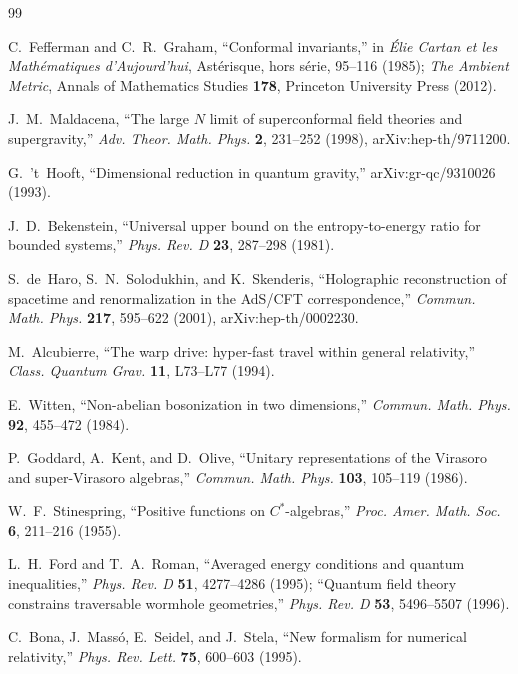 \begin{thebibliography}{99}

C.~Fefferman and C.~R.~Graham, ``Conformal invariants,'' in \textit{Élie Cartan et les Mathématiques d'Aujourd'hui}, Astérisque, hors série, 95--116 (1985); \textit{The Ambient Metric}, Annals of Mathematics Studies \textbf{178}, Princeton University Press (2012).

J.~M.~Maldacena, ``The large $N$ limit of superconformal field theories and supergravity,'' \textit{Adv. Theor. Math. Phys.} \textbf{2}, 231--252 (1998), arXiv:hep-th/9711200.

G.~'t~Hooft, ``Dimensional reduction in quantum gravity,'' arXiv:gr-qc/9310026 (1993).

J.~D.~Bekenstein, ``Universal upper bound on the entropy-to-energy ratio for bounded systems,'' \textit{Phys. Rev. D} \textbf{23}, 287--298 (1981).

S.~de~Haro, S.~N.~Solodukhin, and K.~Skenderis, ``Holographic reconstruction of spacetime and renormalization in the AdS/CFT correspondence,'' \textit{Commun. Math. Phys.} \textbf{217}, 595--622 (2001), arXiv:hep-th/0002230.

M.~Alcubierre, ``The warp drive: hyper-fast travel within general relativity,'' \textit{Class. Quantum Grav.} \textbf{11}, L73--L77 (1994).

E.~Witten, ``Non-abelian bosonization in two dimensions,'' \textit{Commun. Math. Phys.} \textbf{92}, 455--472 (1984).

P.~Goddard, A.~Kent, and D.~Olive, ``Unitary representations of the Virasoro and super-Virasoro algebras,'' \textit{Commun. Math. Phys.} \textbf{103}, 105--119 (1986).

W.~F.~Stinespring, ``Positive functions on $C^*$-algebras,'' \textit{Proc. Amer. Math. Soc.} \textbf{6}, 211--216 (1955).

L.~H.~Ford and T.~A.~Roman, ``Averaged energy conditions and quantum inequalities,'' \textit{Phys. Rev. D} \textbf{51}, 4277--4286 (1995); ``Quantum field theory constrains traversable wormhole geometries,'' \textit{Phys. Rev. D} \textbf{53}, 5496--5507 (1996).

C.~Bona, J.~Massó, E.~Seidel, and J.~Stela, ``New formalism for numerical relativity,'' \textit{Phys. Rev. Lett.} \textbf{75}, 600--603 (1995).


\end{thebibliography}
